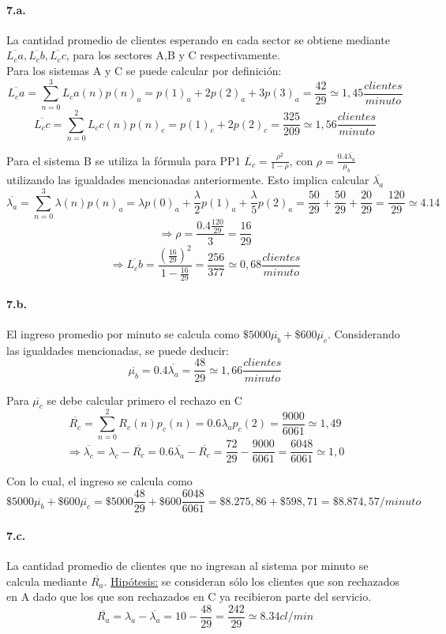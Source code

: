 \documentclass{article}
\begin{document}
  \paragraph{7.a.} La cantidad promedio de clientes esperando en cada sector se obtiene mediante $\overline{L_ca}, \overline{L_cb},\overline{L_cc}$, para los sectores A,B y C respectivamente.\\
  Para los sistemas A y C se puede calcular por definición:
  $$\overline{L_ca} = \sum_{n=0}^{3}L_ca(n) p(n)_a = p(1)_a + 2 p(2)_a + 3 p(3)_a = \frac{42}{29} \simeq 1,45 \frac{clientes}{minuto} $$
  $$\overline{L_cc} = \sum_{n=0}^{2}L_cc(n) p(n)_c = p(1)_c + 2 p(2)_c = \frac{325}{209} \simeq 1,56 \frac{clientes}{minuto} $$
  
  Para el sistema B se utiliza la fórmula para PP1 $\overline{L_c} = \frac{\rho^2}{1-\rho}$, con $\rho = \frac{0.4\overline{\lambda_a}}{\mu_b}$ utilizando las igualdades mencionadas anteriormente. Esto implica calcular $\overline{\lambda_a}$
  $$\overline{\lambda_a} = \sum_{n=0}^{3}\lambda(n) p(n)_a = \lambda p(0)_a + \frac{\lambda}{2} p(1)_a + \frac{\lambda}{5} p(2)_a = \frac{50}{29} + \frac{50}{29} + \frac{20}{29} = \frac{120}{29} \simeq 4.14$$
  $$\Rightarrow \rho = \frac{0.4\frac{120}{29}}{3} = \frac{16}{29} $$
  $$\Rightarrow \overline{L_cb} = \frac{(\frac{16}{29})^2}{1-\frac{16}{29}} = \frac{256}{377} \simeq 0,68 \frac{clientes}{minuto} $$
  
  \paragraph{7.b.} El ingreso promedio por minuto se calcula como $\$5000 \overline{\mu_b} + \$600 \overline{\mu_c} $. Considerando las igualdades mencionadas, se puede deducir:
  $$ \overline{\mu_b} = 0.4\overline{\lambda_a} = \frac{48}{29} \simeq 1,66 \frac{clientes}{minuto}$$ 
  
  Para $\overline{\mu_c}$ se debe calcular primero el rechazo en C
  $$ \overline{R_c} = \sum_{n=0}^{2} R_c(n) p_c(n) = 0.6 \lambda_a p_c(2) =  \frac{9000}{6061} \simeq 1,49$$
  $$\Rightarrow \overline{\lambda_c} = \lambda_c -\overline{R_c} = 0.6\overline{\lambda_a} -\overline{R_c} = \frac{72}{29} - \frac{9000}{6061} = \frac{6048}{6061} \simeq 1,0$$
  
  Con lo cual, el ingreso se calcula como
  $$\$5000 \overline{\mu_b} + \$600 \overline{\mu_c} = \$5000 \frac{48}{29} + \$600 \frac{6048}{6061} = \$8.275,86 + \$598,71 = \$8.874,57 / minuto$$
  
  \paragraph{7.c.} La cantidad promedio de clientes que no ingresan al sistema por minuto se calcula mediante $\overline{R_a}$. 
  \underline{Hipótesis:} se consideran sólo los clientes que son rechazados en A dado que los que son rechazados en C ya recibieron parte del servicio.
  $$\overline{R_a} = \lambda_a -\overline{\lambda_a} = 10 - \frac{48}{29} = \frac{242}{29} \simeq 8.34 cl/min$$
  
\end{document}
